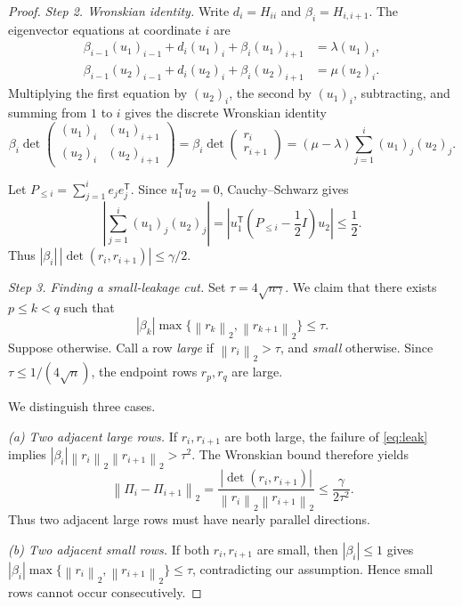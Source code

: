 \documentclass[10pt,a4paper]{article}
\newcommand{\norm}[1]{\left\lVert #1\right\rVert}
\begin{document}
\begin{proof}
\emph{Step 2. Wronskian identity.}
Write $d_i=H_{ii}$ and $\beta_i=H_{i,i+1}$.
The eigenvector equations at coordinate $i$ are
\[
\begin{aligned}
\beta_{i-1}(u_1)_{i-1}+d_i(u_1)_i+\beta_i(u_1)_{i+1}
&=\lambda(u_1)_i,\\
\beta_{i-1}(u_2)_{i-1}+d_i(u_2)_i+\beta_i(u_2)_{i+1}
&=\mu(u_2)_i.
\end{aligned}
\]
Multiplying the first equation by $(u_2)_i$,
the second by $(u_1)_i$, subtracting, and summing
from $1$ to $i$ gives the discrete Wronskian identity
\begin{equation}\label{eq:wronskian}
\boxed{
\beta_i
\det\begin{pmatrix}
(u_1)_i&(u_1)_{i+1}\\
(u_2)_i&(u_2)_{i+1}
\end{pmatrix}
=
\beta_i\det\begin{pmatrix}r_i\\r_{i+1}\end{pmatrix}
=
(\mu-\lambda)\sum_{j=1}^i(u_1)_j(u_2)_j.
}
\end{equation}

Let $P_{\leq i}=\sum_{j=1}^i e_je_j^{\mathsf T}$.
Since $u_1^{\mathsf T}u_2=0$, Cauchy--Schwarz gives
\[
\left|\sum_{j=1}^i(u_1)_j(u_2)_j\right|
=
\left|u_1^{\mathsf T}
\left(P_{\leq i}-\frac12I\right)u_2\right|
\leq\frac12.
\]
Thus
$|\beta_i|\,|\det(r_i,r_{i+1})|\leq\gamma/2$.

\emph{Step 3. Finding a small-leakage cut.}
Set $\tau=4\sqrt{n\gamma}$. We claim that there exists
$p\leq k<q$ such that
\begin{equation}\label{eq:leak}
\boxed{
|\beta_k|\max\{\norm{r_k}_2,\norm{r_{k+1}}_2\}
\leq\tau.
}
\end{equation}
Suppose otherwise. Call a row \emph{large} if
$\norm{r_i}_2>\tau$, and \emph{small} otherwise.
Since $\tau\leq1/(4\sqrt n)$, the endpoint rows
$r_p,r_q$ are large.

We distinguish three cases.

\emph{(a) Two adjacent large rows.}
If $r_i,r_{i+1}$ are both large, the failure of
\eqref{eq:leak} implies
$|\beta_i|\norm{r_i}_2\norm{r_{i+1}}_2>\tau^2$.
The Wronskian bound therefore yields
\[
\norm{\Pi_i-\Pi_{i+1}}_2
=
\frac{|\det(r_i,r_{i+1})|}
{\norm{r_i}_2\norm{r_{i+1}}_2}
\leq\frac{\gamma}{2\tau^2}.
\]
Thus two adjacent large rows must have nearly
parallel directions.

\emph{(b) Two adjacent small rows.}
If both $r_i,r_{i+1}$ are small, then
$|\beta_i|\leq1$ gives
$|\beta_i|\max\{\norm{r_i}_2,\norm{r_{i+1}}_2\}
\leq\tau$, contradicting our assumption.
Hence small rows cannot occur consecutively.


\end{proof}
\end{document}
